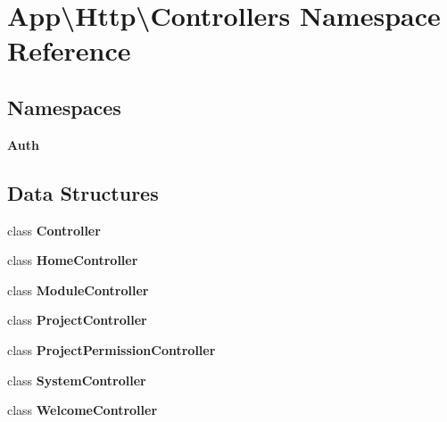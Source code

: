\section{App\textbackslash{}Http\textbackslash{}Controllers Namespace Reference}
\label{namespace_app_1_1_http_1_1_controllers}
\subsection*{Namespaces}
\begin{DoxyCompactItemize}
\item 
 {\bf Auth}
\end{DoxyCompactItemize}
\subsection*{Data Structures}
\begin{DoxyCompactItemize}
\item 
class {\bf Controller}
\item 
class {\bf Home\+Controller}
\item 
class {\bf Module\+Controller}
\item 
class {\bf Project\+Controller}
\item 
class {\bf Project\+Permission\+Controller}
\item 
class {\bf System\+Controller}
\item 
class {\bf Welcome\+Controller}
\end{DoxyCompactItemize}
